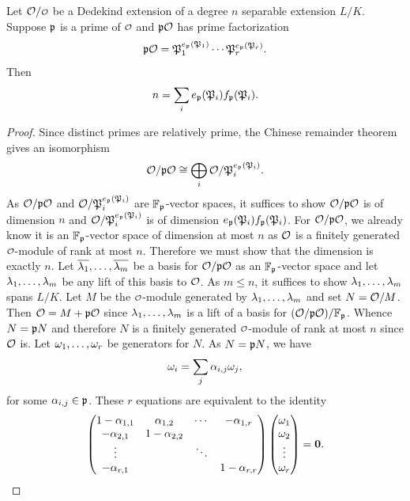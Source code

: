     \begin{theorem*}
      Let \(\mc{O}/\smc{O}\) be a Dedekind extension of a degree \(n\) separable extension \(L/K\). Suppose \(\mathfrak{p}\) is a prime of \(\smc{O}\) and \(\mathfrak{p}\mathcal{O}\) has prime factorization
      \[
        \mathfrak{p}\mathcal{O} = \mathfrak{P}_{1}^{e_{\mathfrak{p}}(\mathfrak{P}_{1})} \cdots \mathfrak{P}_{r}^{e_{\mathfrak{p}}(\mathfrak{P}_{r})}.
      \]
      Then
      \[
        n = \sum_{i}e_{\mathfrak{p}}(\mathfrak{P}_{i})f_{\mathfrak{p}}(\mathfrak{P}_{i}).
      \]
    \end{theorem*}
    \begin{proof}
      Since distinct primes are relatively prime, the Chinese remainder theorem gives an isomorphism
      \[
        \mathcal{O}/\mathfrak{p}\mathcal{O} \cong \bigoplus_{i} \mathcal{O}/\mathfrak{P}_{i}^{e_{\mathfrak{p}}(\mathfrak{P}_{i})}.
      \]
      As \(\mathcal{O}/\mathfrak{p}\mathcal{O}\) and \(\mathcal{O}/\mathfrak{P}_{i}^{e_{\mathfrak{p}}(\mathfrak{P}_{i})}\) are \(\mathbb{F}_{\mathfrak{p}}\)-vector spaces, it suffices to show \(\mathcal{O}/\mathfrak{p}\mathcal{O}\) is of dimension \(n\) and \(\mathcal{O}/\mathfrak{P}_{i}^{e_{\mathfrak{p}}(\mathfrak{P}_{i})}\) is of dimension \(e_{\mathfrak{p}}(\mathfrak{P}_{i})f_{\mathfrak{p}}(\mathfrak{P}_{i})\). For \(\mathcal{O}/\mathfrak{p}\mathcal{O}\), we already know it is an \(\mathbb{F}_{\mathfrak{p}}\)-vector space of dimension at most \(n\) as \(\mathcal{O}\) is a finitely generated \(\smc{O}\)-module of rank at most \(n\). Therefore we must show that the dimension is exactly \(n\). Let \(\overline{\lambda_{1}},\ldots,\overline{\lambda_{m}}\) be a basis for \(\mathcal{O}/\mathfrak{p}\mathcal{O}\) as an \(\mathbb{F}_{\mathfrak{p}}\)-vector space and let \(\lambda_{1},\ldots,\lambda_{m}\) be any lift of this basis to \(\mathcal{O}\). As \(m \le n\), it suffices to show \(\lambda_{1},\ldots,\lambda_{m}\) spans \(L/K\). Let \(M\) be the \(\smc{O}\)-module generated by \(\lambda_{1},\ldots,\lambda_{m}\) and set \(N = \mathcal{O}/M\). Then \(\mathcal{O} = M+\mathfrak{p}\mathcal{O}\) since \(\lambda_{1},\ldots,\lambda_{m}\) is a lift of a basis for \((\mathcal{O}/\mathfrak{p}\mathcal{O})/\mathbb{F}_{\mathfrak{p}}\). Whence \(N = \mathfrak{p}N\) and therefore \(N\) is a finitely generated \(\smc{O}\)-module of rank at most \(n\) since \(\mathcal{O}\) is. Let \(\omega_{1},\ldots,\omega_{r}\) be generators for \(N\). As \(N = \mathfrak{p}N\), we have
      \[
        \omega_{i} = \sum_{j}\alpha_{i,j}\omega_{j},
      \]
      for some \(\alpha_{i,j} \in \mathfrak{p}\). These \(r\) equations are equivalent to the identity
      \[
        \begin{pmatrix} 1-\alpha_{1,1} & \alpha_{1,2} & \cdots & -\alpha_{1,r} \\ -\alpha_{2,1} & 1-\alpha_{2,2} & & \\ \vdots & & \ddots & \\ -\alpha_{r,1} & & & 1-\alpha_{r,r} \end{pmatrix}\begin{pmatrix} \omega_{1} \\ \omega_{2} \\ \vdots \\ \omega_{r} \end{pmatrix} = \mathbf{0}.
\]
\end{proof}

